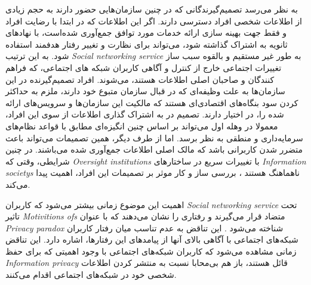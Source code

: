 \fi %
به نظر می‌رسد تصمیم‌گیرندگانی که در چنین سازمان‌هایی حضور دارند به حجم زیادی از اطلاعات
شخصی افراد دسترسی دارند. اگر این اطلاعات که در ابتدا با رضایت افراد و فقط جهت بهینه سازی ارائه خدمات مورد توافق جمع‌آوری شده‌است، با نهادهای ثانویه
به اشتراک گذاشته شود، می‌تواند برای نظارت و تغییر رفتار هدفمند استفاده شود. به این ترتیب
\textit{
  \gls{Social networking service}
}
به طور غیر مستقیم و بالقوه سبب ساز تغییرات اجتماعی خارج از کنترل و آگاهی کاربران شبکه های اجتماعی، که فراهم کنندگان و صاحبان اصلی
اطلاعات هستند، می‌شوند.
افراد تصمیم‌گیرنده در این سازمان‌ها به علت وظیفه‌ای که در قبال سازمان
متبوع خود دارند، ملزم به حداکثر کردن سود بنگاه‌های اقتصادی‌ای هستند
که مالکیت این سازمان‌ها و سرویس‌های ارائه شده را، در اختیار
دارند. تصمیم در به اشتراک گذاری اطلاعات از سوی این افراد، معمولا در وهله اول می‌تواند بر اساس چنین انگیزه‌ای مطابق با قواعد نظام‌های سرمایه‌داری و منطقی به نظر برسد.
اما از طرف دیگر، همین تصمیمات می‌تواند باعث متضرر شدن
کاربرانی باشد که مالک اصلی اطلاعات جمع‌آوری شده می‌باشند. در چنین شرایطی، وقتی که
\textit{
  \glspl{Oversight institution}
}
با تغییرات سریع  در ساختارهای
\textit{
  \glspl{Information society}
}
ناهماهنگ هستند
\!\citep{cavoukianDiscussionPaperPrivacy2009,machovaDiscourseSurveillancePrivacy2021}،
بررسی ساز و کار موثر بر تصمیمات این افراد، اهمیت پیدا می‌کند.


اهمیت  این موضوع زمانی بیشتر می‌شود که کاربران
\textit{
  \gls{Social networking service}
}
تحت تاثیر
\textit{
  \glspl{Motivitions of}
}
متضاد قرار می‌گیرند و رفتاری را نشان می‌دهند که با عنوان
\textit{
  \gls{Privacy paradox}
}
شناخته می‌شود
\!\citep{barthPrivacyParadoxInvestigating2017}.
این تناقض به عدم تناسب میان رفتار کاربران شبکه‌های اجتماعی با آگاهی بالای آنها از پیامدهای این رفتارها، اشاره دارد.
این تناقض زمانی مشاهده می‌شود که کاربران شبکه‌های اجتماعی با وجود اهمیتی که برای حفظ
\textit{
  \gls{Information privacy}
}
قائل هستند،  باز هم بی‌محابا نسبت به  منتشر کردن اطلاعات شخصی خود
در شبکه‌های اجتماعی اقدام می‌کنند.

